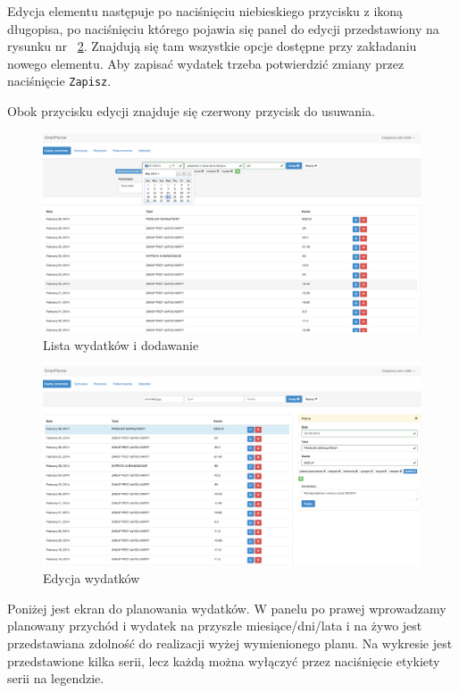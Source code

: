 \documentclass[10pt,titlepage]{article}
\begin{document}
\par Edycja elementu następuje po naciśnięciu niebieskiego przycisku z ikoną długopisa, po naciśnięciu którego pojawia się panel do edycji przedstawiony na rysunku nr ~\ref{screen:editExpense}. Znajdują się tam wszystkie opcje dostępne przy zakładaniu nowego elementu. Aby zapisać wydatek trzeba potwierdzić zmiany przez naciśnięcie \verb|Zapisz|.
\par Obok przycisku edycji znajduje się czerwony przycisk do usuwania.
\begin{figure}[H]
  \centering
  \includegraphics[scale=0.2]{images/screen_dodawaniewydatkow.png}
  \caption{Lista wydatków i dodawanie}
  \label{screen:listExpense}
\end{figure}
\begin{figure}[H]
  \centering
  \includegraphics[scale=0.2]{images/screen_edycjaWydatku.png}
  \caption{Edycja wydatków}
  \label{screen:editExpense}
\end{figure}
\par Poniżej jest ekran do planowania wydatków. W panelu po prawej wprowadzamy planowany przychód i wydatek na przyszłe miesiące/dni/lata i na żywo jest przedstawiana zdolność do realizacji wyżej wymienionego planu. Na wykresie jest przedstawione kilka serii, lecz każdą można wyłączyć przez naciśnięcie etykiety serii na legendzie.
\end{document}
